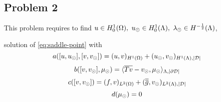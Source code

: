 \subsection{Problem 2}
This problem requires to find $u \in H^1_0(\Omega),\ u_{\odot} \in H^1_0(\Lambda), \ \lambda_{\odot} \in H^{-\frac12}(\Lambda)$, %

solution of \eqref{eq:saddle-point} with
\begin{equation*}
a([u, u_{\odot}], [v, v_{\odot}])= (u,v)_{H^1(\Omega)} + (u_{\odot},v_{\odot})_{H^1(\Lambda),|\mathcal{D}|}
\end{equation*} 
\begin{equation*}
b([v, v_{\odot}], \mu_{\odot})=  \langle  \overline{Tv} - v_{\odot}, \mu_{\odot} \rangle_{\Lambda, |\partial\mathcal{D}|} 
\end{equation*} 
\begin{equation*}
c([v,v_{\odot}])= (f,v)_{L^2(\Omega)} + (\overline{\overline{g}},v_{\odot})_{L^2(\Lambda),|\mathcal{D}|}
\end{equation*}
\begin{equation*}
d(\mu_{\odot})=0
\end{equation*}




